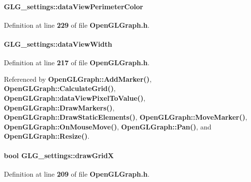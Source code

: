 \paragraph[{data\+View\+Perimeter\+Color}]{ G\+L\+G\+\_\+settings\+::data\+View\+Perimeter\+Color}\label{structGLG__settings_ace840d271a10b682f75b5f4bb9fc4391}


Definition at line {\bf 229} of file {\bf Open\+G\+L\+Graph.\+h}.

\paragraph[{data\+View\+Width}]{ G\+L\+G\+\_\+settings\+::data\+View\+Width}\label{structGLG__settings_ac8de0be27c624e876f0542f7f78d8abe}


Definition at line {\bf 217} of file {\bf Open\+G\+L\+Graph.\+h}.



Referenced by {\bf Open\+G\+L\+Graph\+::\+Add\+Marker()}, {\bf Open\+G\+L\+Graph\+::\+Calculate\+Grid()}, {\bf Open\+G\+L\+Graph\+::data\+View\+Pixel\+To\+Value()}, {\bf Open\+G\+L\+Graph\+::\+Draw\+Markers()}, {\bf Open\+G\+L\+Graph\+::\+Draw\+Static\+Elements()}, {\bf Open\+G\+L\+Graph\+::\+Move\+Marker()}, {\bf Open\+G\+L\+Graph\+::\+On\+Mouse\+Move()}, {\bf Open\+G\+L\+Graph\+::\+Pan()}, and {\bf Open\+G\+L\+Graph\+::\+Resize()}.

\paragraph[{draw\+GridX}]{\setlength{\rightskip}{0pt plus 5cm}bool G\+L\+G\+\_\+settings\+::draw\+GridX}\label{structGLG__settings_a5cc47fa466a371af7a2d7aead86a7034}


Definition at line {\bf 209} of file {\bf Open\+G\+L\+Graph.\+h}.

